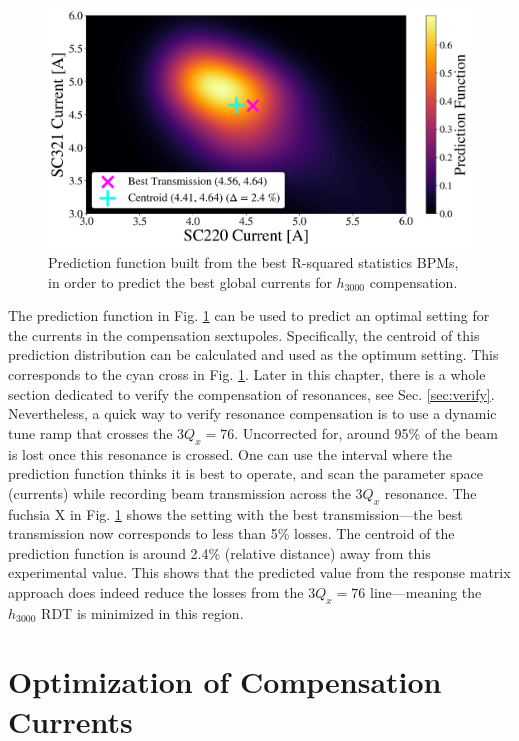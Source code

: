 \begin{figure}[H]
    \centering
    \includegraphics[width=\columnwidth]{chapter4/comp_interval.png}
    \caption{Prediction function built from the best R-squared statistics BPMs, in order to predict the best global currents for $h_{3000}$ compensation.}
    \label{fig:icomp_int}
\end{figure}

The prediction function in Fig. \ref{fig:icomp_int} can be used to predict an optimal setting for the currents in the compensation sextupoles. Specifically, the centroid of this prediction distribution can be calculated and used as the optimum setting. This corresponds to the cyan cross in Fig. \ref{fig:icomp_int}. Later in this chapter, there is a whole section dedicated to verify the compensation of resonances, see Sec. \ref{sec:verify}. Nevertheless, a quick way to verify resonance compensation is to use a dynamic tune ramp that crosses the $3Q_x=76$. Uncorrected for, around 95\% of the beam is lost once this resonance is crossed. One can use the interval where the prediction function thinks it is best to operate, and scan the parameter space (currents) while recording beam transmission across the $3Q_x$ resonance. The fuchsia X in Fig. \ref{fig:icomp_int} shows the setting with the best transmission---the best transmission now corresponds to less than 5\% losses. The centroid of the prediction function is around 2.4\% (relative distance) away from this experimental value. This shows that the predicted value from the response matrix approach does indeed reduce the losses from the $3Q_x=76$ line---meaning the $h_{3000}$ RDT is minimized in this region.

\section{Optimization of Compensation Currents}

